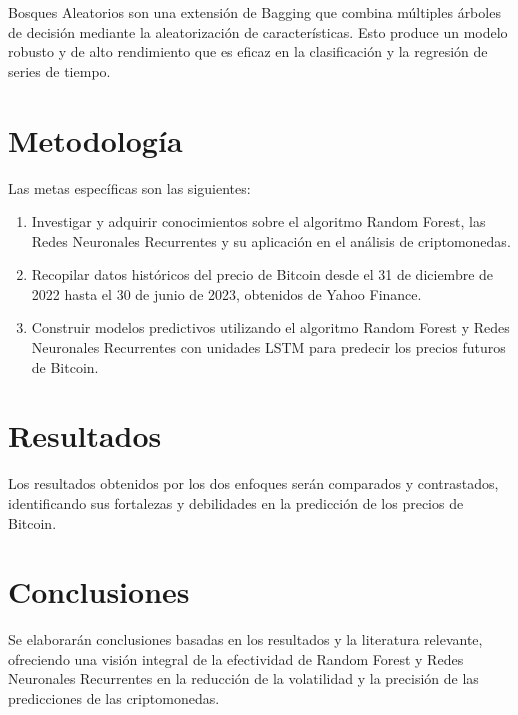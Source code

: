 \documentclass[final, 20pt, a2paper, portrait]{extarticle}
\begin{document}
Bosques Aleatorios son una extensión de Bagging que combina múltiples árboles de decisión mediante la aleatorización de características. Esto produce un modelo robusto y de alto rendimiento que es eficaz en la clasificación y la regresión de series de tiempo.

\section*{Metodología}
Las metas específicas son las siguientes:
    \begin{enumerate}
        \item Investigar y adquirir conocimientos sobre el algoritmo Random Forest, las Redes Neuronales Recurrentes y su aplicación en el análisis de criptomonedas.
        \item Recopilar datos históricos del precio de Bitcoin desde el 31 de diciembre de 2022 hasta el 30 de junio de 2023, obtenidos de Yahoo Finance.
        \item Construir modelos predictivos utilizando el algoritmo Random Forest y Redes Neuronales Recurrentes con unidades LSTM para predecir los precios futuros de Bitcoin.
    \end{enumerate}

\section*{Resultados}
Los resultados obtenidos por los dos enfoques serán comparados y contrastados, identificando sus fortalezas y debilidades en la predicción de los precios de Bitcoin.

\section*{Conclusiones}
Se elaborarán conclusiones basadas en los resultados y la literatura relevante, ofreciendo una visión integral de la efectividad de Random Forest y Redes Neuronales Recurrentes en la reducción de la volatilidad y la precisión de las predicciones de las criptomonedas.
\end{document}
